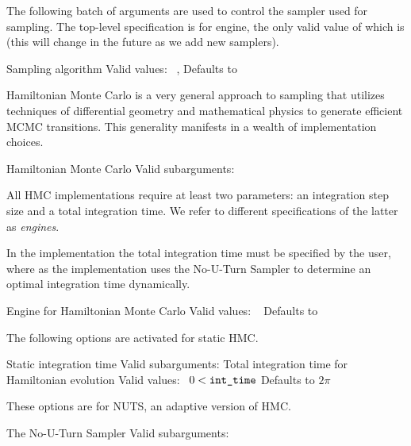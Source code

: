 The following batch of arguments are used to control the sampler used
for sampling.  The top-level specification is for engine, the only
valid value of which is  (this will change in the future as
we add new samplers).  

\begin{description}
      {Sampling algorithm}
      {Valid values: \  ,  }
      {Defaults to }
\end{description}
%
Hamiltonian Monte Carlo is a very general approach to sampling that
utilizes techniques of differential geometry and mathematical physics
to generate efficient MCMC transitions.  This generality manifests in
a wealth of implementation choices.
%
\begin{description}
        {Hamiltonian Monte Carlo}
        {Valid subarguments: }
\end{description}
%
All HMC implementations require at least two parameters: an
integration step size and a total integration time.  We refer to
different specifications of the latter as \textit{engines}.

In the  implementation the total integration time
must be specified by the user, where as the 
implementation uses the No-U-Turn Sampler to determine
an optimal integration time dynamically. 
%
\begin{description}
          {Engine for Hamiltonian Monte Carlo}
          {Valid values: \  }
          {Defaults to }
\end{description}
%
The following options are activated for static HMC.
%
\begin{description}
            {Static integration time}
            {Valid subarguments: }
%
              {Total integration time for Hamiltonian evolution}
              {Valid values: \  $0 < \mbox{{\tt int\_time}}$}
              {Defaults to $2\pi$}
\end{description}
%
These options are for NUTS, an adaptive version of HMC.
%
\begin{description}
            {The No-U-Turn Sampler}
            {Valid subarguments: }
%
\end{description}

